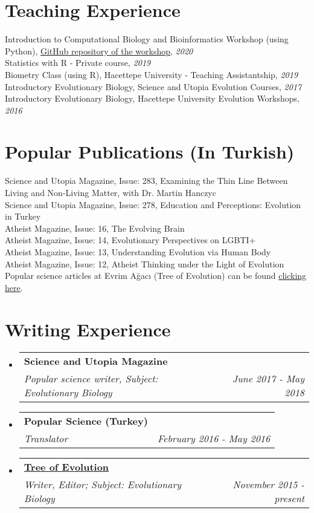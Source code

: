 \documentclass[letterpaper,11pt]{article}
\makeatletter
\newcommand{\resumeSubheading}[4]{
  \vspace{-1pt}\item
    \begin{tabular*}{0.97\textwidth}{l@{\extracolsep{\fill}}r}
      \textbf{#1} & #2 \\
      \textit{\small#3} & \textit{\small #4} \\
    \end{tabular*}\vspace{-5pt}
}
\newcommand{\resumeSubHeadingListStart}{\begin{itemize}[leftmargin=*]}
\newcommand{\resumeSubHeadingListEnd}{\end{itemize}}
\makeatother
\begin{document}
\section{Teaching Experience}
Introduction to Computational Biology and Bioinformatics Workshop (using Python), \href{https://github.com/isinaltinkaya/Hesaplamali_Biyoloji_ve_Biyoinformatige_Giris_2020}{GitHub repository of the workshop}, \textit{2020}\\
Statistics with R - Private course, \textit{2019} \\
Biometry Class (using R), Hacettepe University - Teaching Assistantship, \textit{2019} \\
Introductory Evolutionary Biology, Science and Utopia Evolution Courses, \textit{2017} \\
Introductory Evolutionary Biology, Hacettepe University Evolution Workshops, \textit{2016} \\


\section{Popular Publications (In Turkish)}
Science and Utopia Magazine, Issue: 283, Examining the Thin Line Between Living and Non-Living Matter, with Dr. Martin Hanczyc \\
Science and Utopia Magazine, Issue: 278, Education and Perceptions: Evolution in Turkey \\
Atheist Magazine, Issue: 16, The Evolving Brain \\
Atheist Magazine, Issue: 14, Evolutionary Perspectives on LGBTI+ \\
Atheist Magazine, Issue: 13, Understanding Evolution via Human Body \\
Atheist Magazine, Issue: 12, Atheist Thinking under the Light of Evolution \\
Popular science articles at Evrim A\u{g}ac{\i} (Tree of Evolution) can be found  \href{https://evrimagaci.org/isinaltinkaya/}{clicking here}. 

\section{Writing Experience}
  \resumeSubHeadingListStart
    \resumeSubheading
      {Science and Utopia Magazine}{ }
      {Popular science writer, Subject: Evolutionary Biology}{June 2017 - May 2018}
    \resumeSubheading
      {Popular Science (Turkey)}{ }
      {Translator}{February 2016 - May 2016}
    \resumeSubheading
      {\href{https://evrimagaci.org/isinaltinkaya/}{Tree of Evolution}}{}
      {Writer, Editor; Subject: Evolutionary Biology}{November 2015 - present}
  \resumeSubHeadingListEnd
\end{document}
